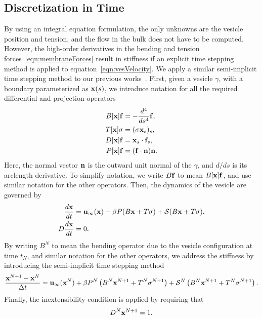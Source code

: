 \documentclass[aps,prl,showpacs]{revtex4}
\begin{document}
\subsection{Discretization in Time}
By using an integral equation formulation, the only unknowns are the
vesicle position and tension, and the flow in the bulk does not have to
be computed. However, the high-order derivatives in the bending and
tension forces~\eqref{eqn:membraneForces} result in stiffness if an
explicit time stepping method is applied to
equation~\eqref{eqn:vesVelocity}. We apply a similar semi-implicit time
stepping method to our previous works~\cite{vee-gue-zor-bir2009,
qua-bir2014}. First, given a vesicle $\gamma$, with a boundary
parameterized as $\mathbf{x}(s)$, we introduce notation for all the required
differential and projection operators
\begin{align}
  B[\mathbf{x}]\mathbf{f} &= -\frac{d^4}{ds^4} \mathbf{f}, \\
  T[\mathbf{x}]\sigma &= (\sigma \mathbf{x}_s)_s, \\
  D[\mathbf{x}]\mathbf{f} &= \mathbf{x}_s \cdot \mathbf{f}_s, \\
  P[\mathbf{x}]\mathbf{f} &= (\mathbf{f} \cdot \mathbf{n}) \mathbf{n}. 
\end{align}
Here, the normal vector $\mathbf{n}$ is the outward unit normal of the
$\gamma$, and $d/ds$ is its arclength derivative. To simplify notation,
we write $B\mathbf{f}$ to mean $B[\mathbf{x}]\mathbf{f}$, and use similar notation for the
other operators. Then, the dynamics of the vesicle are governed by
\begin{align}
  \frac{d\mathbf{x}}{dt} &= \mathbf{u}_{\infty}(\mathbf{x}) + 
  \beta P(B\mathbf{x} + T\sigma) + \mathcal{S}(B\mathbf{x} + T\sigma), \\
  D \frac{d\mathbf{x}}{dt} &= 0.
\end{align}
By writing $B^N$ to mean the bending operator due to the vesicle
configuration at time $t_N$, and similar notation for the other
operators, we address the stiffness by introducing the semi-implicit
time stepping method
\begin{align}  
  \frac{\mathbf{x}^{N+1} - \mathbf{x}^N}{\Delta t} = \mathbf{u}_\infty(\mathbf{x}^N) 
  + \beta P^N\left(B^N\mathbf{x}^{N+1} + T^N\sigma^{N+1}\right) 
  + \mathcal{S}^N\left(B^N\mathbf{x}^{N+1} + T^N\sigma^{N+1}\right).
\end{align}
Finally, the inextensibility condition is applied by requiring that 
\begin{align}
  D^N\mathbf{x}^{N+1} = 1.
\end{align}



\end{document}
